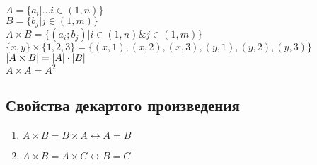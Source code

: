 \documentclass[12pt]{article}
\DeclarePairedDelimiter\abs{\lvert}{\rvert}%
\begin{document}
$A = \{a_i | ...i \in (1, n)\}$\\
$B = \{b_j| j \in (1, m)\}$\\
$A \times B = \{(a_i; b_j)|i \in (1,n) \& j \in (1, m)\}$\\
$\{x, y\} \times \{1, 2, 3\} = \{(x, 1), (x, 2), (x, 3), (y, 1), (y, 2), (y, 3)\}$\\
$\abs{A \times B} = \abs{A} \cdot \abs{B}$\\
$A \times A = A^2$\\
\subsection{Свойства декартого произведения}
\begin{enumerate}
	\item $A \times B = B \times A \leftrightarrow A = B$
	\item $A \times B = A \times C \leftrightarrow B=C$
\end{enumerate}
\end{document}
